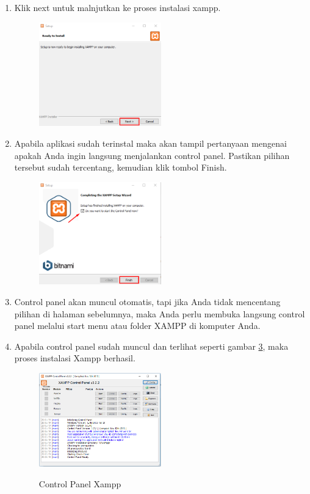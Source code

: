 \begin{enumerate}
	\item Klik next untuk malnjutkan ke proses instalasi xampp.
		\begin{figure}[!htbp]
    		\centering
    		\includegraphics[width=0.5\textwidth]{figures/Xampp7.png}
    		\label{Xampp7}
		\end{figure}
		
	\item Apabila aplikasi sudah terinstal maka akan tampil pertanyaan mengenai apakah Anda ingin langsung menjalankan control panel. Pastikan pilihan tersebut sudah tercentang, kemudian klik tombol Finish.
		\begin{figure}[!htbp]
    		\centering
    		\includegraphics[width=0.5\textwidth]{figures/Xampp8.png}
    		\label{Xampp8}
		\end{figure}
		
	\item Control panel akan muncul otomatis, tapi jika Anda tidak mencentang pilihan di halaman sebelumnya, maka Anda perlu membuka langsung control panel melalui start menu atau folder XAMPP di komputer Anda.
	
	\item Apabila control panel sudah muncul dan terlihat seperti gambar \ref{Xampp9}, maka proses instalasi Xampp berhasil.
		\begin{figure}[!htbp]
    		\centering
    		\caption{Control Panel Xampp}
    		\includegraphics[width=0.5\textwidth]{figures/Xampp9.PNG}
    		\label{Xampp9}
		\end{figure}
\end{enumerate}

